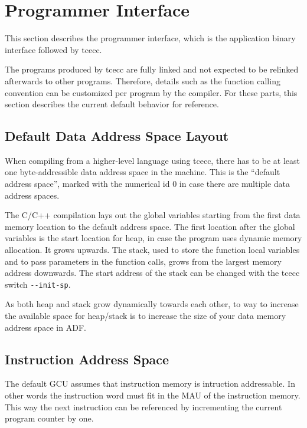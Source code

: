 \documentclass[twoside]{tceusermanual}
\begin{document}
\section{Programmer Interface}

This section describes the programmer interface, which is 
the application binary interface followed by tcecc.

The programs produced by tcecc are fully linked and not expected
to be relinked afterwards to other programs. Therefore, details 
such as the function calling convention can be customized per program by 
the compiler. For these parts, this section describes the current 
default behavior for reference.

\subsection{Default Data Address Space Layout}
\label{ssec:address-spaces-of-umach}

When compiling from a higher-level language using tcecc, there 
has to be at least one byte-addressible data address space in the machine. 
This is the ``default address space'', marked with the numerical 
id 0 in case there are multiple data address spaces. 

The C/C++ compilation lays out the global variables starting from the 
first data memory location to the default address space. The first 
location after the global variables is the start location for heap, 
in case the program uses dynamic memory allocation. It grows upwards. 
The stack, used to store the function local variables and to pass 
parameters in the function calls, grows from the largest memory address 
downwards. The start address of the stack can be changed with the tcecc 
switch \verb|--init-sp|.

As both heap and stack grow dynamically towards each other, to way to
increase the available space for heap/stack is to 
increase the size of your data memory address space in ADF. 

\subsection{Instruction Address Space}

The default GCU assumes that instruction memory is intruction addressable. In
other words the instruction word must fit in the MAU of the instruction
memory. This way the next instruction can be referenced by incrementing the
current program counter by one.
\end{document}

